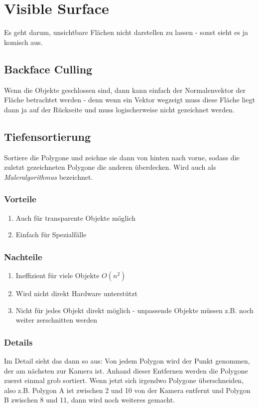 \chapter{Visible Surface}
Es geht darum, unsichtbare Flächen nicht darstellen zu lassen - sonst sieht es ja komisch aus.

\section{Backface Culling}
Wenn die Objekte geschlossen sind, dann kann einfach der Normalenvektor der Fläche betrachtet werden - denn wenn ein Vektor wegzeigt muss diese Fläche liegt dann ja auf der Rückseite und muss logischerweise nicht gezeichnet werden.

\section{Tiefensortierung}
Sortiere die Polygone und zeichne sie dann von hinten nach vorne, sodass die zuletzt gezeichneten Polygone die anderen überdecken. Wird auch als \textit{Maleralgorithmus} bezeichnet.
\subsection{Vorteile}
\begin{enumerate}
	\item Auch für transparente Objekte möglich
	\item Einfach für Spezialfälle
\end{enumerate}
\subsection{Nachteile}
\begin{enumerate}
	\item Ineffizient für viele Objekte \(O(n^2)\)
	\item Wird nicht direkt Hardware unterstützt
	\item Nicht für jedes Objekt direkt möglich - unpassende Objekte  müssen z.B. noch weiter zerschnitten werden
\end{enumerate}
\subsection{Details}
Im Detail sieht das dann so aus:
Von jedem Polygon wird der Punkt genommen, der am nächsten zur Kamera ist. Anhand dieser Entfernen werden die Polygone zuerst einmal grob sortiert. Wenn jetzt sich irgendwo Polygone überschneiden, also z.B. Polygon A ist zwischen 2 und 10 von der Kamera entfernt und Polygon B zwischen 8 und 11, dann wird noch weiteres gemacht.


